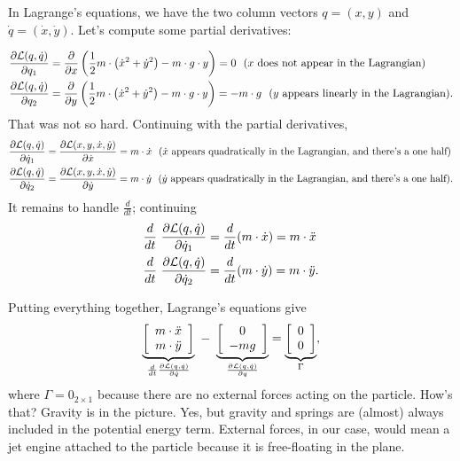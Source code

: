 In Lagrange's equations, we have the two column vectors $q = (x, y)$ and $\dot{q} = (\dot{x}, \dot{y})$. Let's compute some partial derivatives:

\begin{align*}
    \frac{ \partial {\cal L}(q, \dot{q}) }{\partial q_1}& =  \frac{ \partial }{\partial x} \left( \frac{1}{2} m \cdot \left( \dot{x}^2 + \dot{y}^2 \right) -  m \cdot g \cdot y \right)  = 0 ~~( x \text{ does not appear in the Lagrangian}) \\
      \frac{ \partial {\cal L}(q, \dot{q}) }{\partial q_2}& =  \frac{ \partial }{\partial y} \left( \frac{1}{2} m \cdot \left( \dot{x}^2 + \dot{y}^2 \right) -  m \cdot g \cdot y \right)  = - m \cdot g ~~( y \text{ appears linearly in the Lagrangian} ).
\end{align*}
That was not so hard. Continuing with the partial derivatives, 
\begin{align*}
    \frac{ \partial {\cal L}(q, \dot{q})}{\partial \dot{q}_1}& =  \frac{ \partial {\cal L}(x, y, \dot{x}, \dot{y})}{\partial \dot{x}} = m \cdot \dot{x} ~~( \dot{x}  \text{ appears quadratically in the Lagrangian, and there's a one half}) \\
    \frac{ \partial {\cal L}(q, \dot{q})}{\partial \dot{q}_2}& =  \frac{ \partial {\cal L}(x, y, \dot{x}, \dot{y})}{\partial  \dot{y}} = m \cdot \dot{y} ~~( \dot{y}  \text{ appears quadratically in the Lagrangian, and there's a one half}).
\end{align*}
It remains to handle $\frac{d}{dt}$; continuing
\begin{align*}
   \frac{d}{dt}~ \frac{ \partial {\cal L}(q, \dot{q})}{\partial \dot{q}_1}& =  \frac{d}{dt}(m \cdot \dot{x}) = m \cdot \ddot{x}\\
   \frac{d}{dt}~ \frac{ \partial {\cal L}(q, \dot{q})}{\partial \dot{q}_2}& =  \frac{d}{dt} (m \cdot \dot{y}) = m \cdot \ddot{y}.
\end{align*}

Putting everything together, Lagrange's equations give
\begin{equation}
\label{eq:DddotqPointMass}
    \underbrace{\left[ \begin{array}{c} m \cdot \ddot{x} \\ m \cdot \ddot{y} \end{array} \right]}_{ \frac{d}{dt} \frac{ \partial {\cal L}(q, \dot{q})}{\partial\dot{q}}} ~- ~\underbrace{\left[ \begin{array}{c} 0 \\ -m g \end{array} \right]}_{\frac{ \partial {\cal L}(q, \dot{q})}{\partial q}}
= \underbrace{\left[ \begin{array}{c} 0 \\ 0 \end{array} \right]}_{\Gamma},
\end{equation}
where $\Gamma = 0_{2 \times 1}$ because there are no external forces acting on the particle. How's that? Gravity is in the picture. Yes, but gravity and springs are (almost) always included in the potential energy term. External forces, in our case, would mean a jet engine attached to the particle because it is free-floating in the plane.

